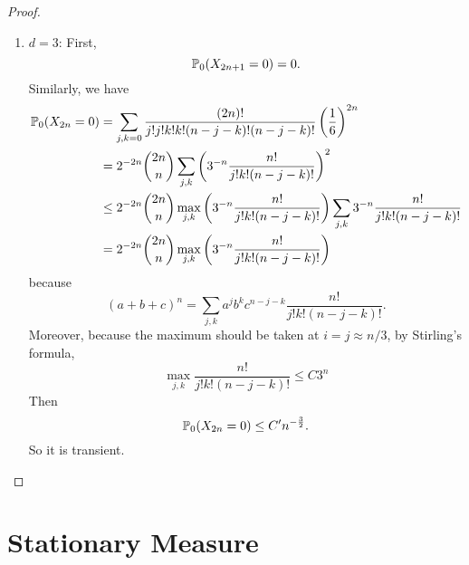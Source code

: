\begin{exam}
\begin{proof}
\begin{enumerate}[label=(\roman{*})]
            \item $d = 3$: First,
            \begin{equation*}
                \mathbb{P}_0(X_{2n+1} = 0) = 0.
            \end{equation*}
            Similarly, we have
            \begin{equation*}
                \begin{aligned}
                    \mathbb{P}_0(X_{2n} = 0) &= \sum_{j,k=0} \frac{(2n)!}{j!j!k!k!(n-j-k)!(n-j-k)!}\left(\frac{1}{6}\right)^{2n} \\
                    &= 2^{-2n}\binom{2n}{n} \sum_{j,k}\left(3^{-n} \frac{n!}{j!k!(n-j-k)!}\right)^2 \\
                    &\leq 2^{-2n}\binom{2n}{n} \max_{j,k}\left(3^{-n} \frac{n!}{j!k!(n-j-k)!}\right) \sum_{j,k}3^{-n} \frac{n!}{j!k!(n-j-k)!} \\
                    &= 2^{-2n}\binom{2n}{n} \max_{j,k}\left(3^{-n} \frac{n!}{j!k!(n-j-k)!}\right)
                \end{aligned}
            \end{equation*}
            because
            \begin{equation*}
                (a+b+c)^n = \sum_{j,k}a^jb^kc^{n-j-k} \frac{n!}{j!k!(n-j-k)!}.
            \end{equation*}
            Moreover, because the maximum should be taken at $i = j \approx n / 3$, by Stirling's formula,
            \begin{equation*}
                 \max_{j,k}\frac{n!}{j!k!(n-j-k)!} \leq C3^n
            \end{equation*}
            Then
            \begin{equation*}
                \mathbb{P}_0(X_{2n} = 0) \leq C^\prime n^{-\frac{3}{2}}.
            \end{equation*}
            So it is transient. \qedhere
        \end{enumerate}
    \end{proof} 
\end{exam}

\section{Stationary Measure}

